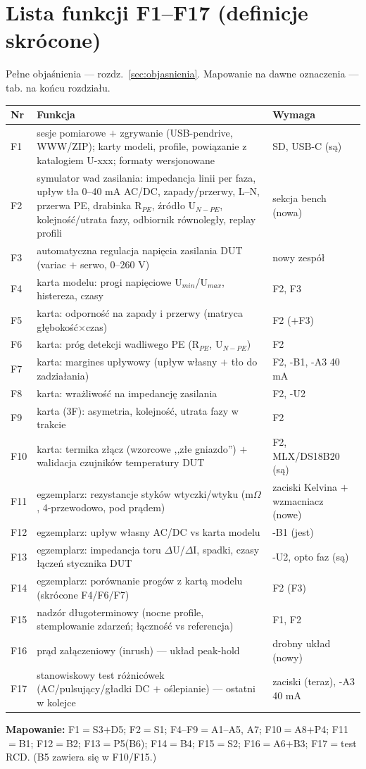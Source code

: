 \documentclass[11pt,a4paper]{article}
\newcommand{\ohm}{$\Omega$}
\begin{document}
\section{Lista funkcji F1--F17 (definicje skrócone)}
Pełne objaśnienia --- rozdz.~\ref{sec:objasnienia}. Mapowanie na dawne oznaczenia --- tab. na
końcu rozdziału.
\begin{longtable}{@{}p{}p{}p{}@{}}
\toprule
\textbf{Nr} & \textbf{Funkcja} & \textbf{Wymaga}\\
\midrule
F1 & sesje pomiarowe $+$ zgrywanie (USB-pendrive, WWW/ZIP); karty modeli, profile, powiązanie
z katalogiem U-xxx; formaty wersjonowane & SD, USB-C (są)\\
F2 & symulator wad zasilania: impedancja linii per faza, upływ tła 0--40 mA AC/DC, zapady/przerwy,
L--N, przerwa PE, drabinka R$_{PE}$, źródło U$_{N-PE}$, kolejność/utrata fazy, odbiornik
równoległy, replay profili & sekcja bench (nowa)\\
F3 & automatyczna regulacja napięcia zasilania DUT (variac $+$ serwo, 0--260 V) & nowy zespół\\
F4 & karta modelu: progi napięciowe U$_{min}$/U$_{max}$, histereza, czasy & F2, F3\\
F5 & karta: odporność na zapady i przerwy (matryca głębokość$\times$czas) & F2 ($+$F3)\\
F6 & karta: próg detekcji wadliwego PE (R$_{PE}$, U$_{N-PE}$) & F2\\
F7 & karta: margines upływowy (upływ własny $+$ tło do zadziałania) & F2, -B1, -A3 40 mA\\
F8 & karta: wrażliwość na impedancję zasilania & F2, -U2\\
F9 & karta (3F): asymetria, kolejność, utrata fazy w trakcie & F2\\
F10 & karta: termika złącz (wzorcowe ,,złe gniazdo'') $+$ walidacja czujników temperatury DUT &
F2, MLX/DS18B20 (są)\\
F11 & egzemplarz: rezystancje styków wtyczki/wtyku (m\ohm, 4-przewodowo, pod prądem) & zaciski
Kelvina $+$ wzmacniacz (nowe)\\
F12 & egzemplarz: upływ własny AC/DC vs karta modelu & -B1 (jest)\\
F13 & egzemplarz: impedancja toru $\Delta$U/$\Delta$I, spadki, czasy łączeń stycznika DUT &
-U2, opto faz (są)\\
F14 & egzemplarz: porównanie progów z kartą modelu (skrócone F4/F6/F7) & F2 (F3)\\
F15 & nadzór długoterminowy (nocne profile, stemplowanie zdarzeń; łączność vs referencja) &
F1, F2\\
F16 & prąd załączeniowy (inrush) --- układ peak-hold & drobny układ (nowy)\\
F17 & stanowiskowy test różnicówek (AC/pulsujący/gładki DC $+$ oślepianie) --- ostatni w kolejce &
zaciski (teraz), -A3 40 mA\\
\bottomrule
\end{longtable}
\textbf{Mapowanie:} F1$=$S3$+$D5; F2$=$S1; F4--F9$=$A1--A5, A7; F10$=$A8$+$P4; F11$=$B1;
F12$=$B2; F13$=$P5(B6); F14$=$B4; F15$=$S2; F16$=$A6$+$B3; F17$=$test RCD. (B5 zawiera się
w F10/F15.)
\end{document}
